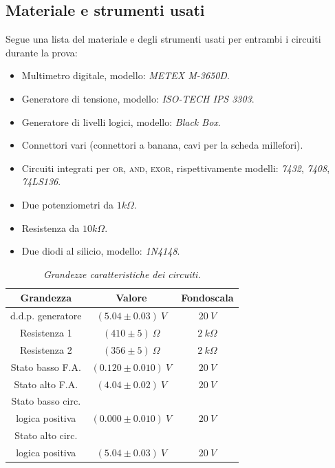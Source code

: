 \subsection{Materiale e strumenti usati}\label{subsec:materiali}
Segue una lista del materiale e degli strumenti usati per entrambi i circuiti durante la prova:
\begin{itemize}
  \item%
  Multimetro digitale, modello: \emph{METEX M-3650D}.
  \item%
  Generatore di tensione, modello: \emph{ISO-TECH IPS 3303}.
  \item%
  Generatore di livelli logici, modello: \emph{Black Box}. %
  \item%
  Connettori vari (connettori a banana, cavi per la scheda millefori).
  \item%
  Circuiti integrati per \textsc{or}, \textsc{and}, \textsc{exor}, rispettivamente modelli: \emph{7432}, \emph{7408}, \emph{74LS136}.
  \item%
  Due potenziometri da $1k\Omega$.
  \item%
  Resistenza da $10k\Omega$.
  \item%
  Due diodi al silicio, modello: \emph{1N4148}.
\end{itemize}

\begin{table}[H]
  \centering
  \begin{tabular}[t]{c | c  c }
    \hline
    Grandezza & Valore & Fondoscala \\
    \hline
    d.d.p. generatore & $(5.04 \pm 0.03) \: V$ & $20 \: V$ \\
    Resistenza 1 & $(410 \pm 5) \: \Omega$ & $2 \: k\Omega$ \\
    Resistenza 2 & $(356 \pm 5) \: \Omega$ & $2 \: k\Omega$ \\
    Stato basso F.A. & $(0.120 \pm 0.010) \: V$ & $20 \: V$ \\
    Stato alto F.A. & $(4.04 \pm 0.02) \: V$ & $20 \: V$ \\
    Stato basso circ.\\ logica positiva & $(0.000 \pm 0.010) \: V$ & $20 \: V$ \\
    Stato alto circ.\\ logica positiva & $(5.04 \pm 0.03) \: V$ & $20 \: V$ \\
    \hline
  \end{tabular}
  \caption{\emph{Grandezze caratteristiche dei circuiti.}}
  \label{tab:livelli-logici}
\end{table}
